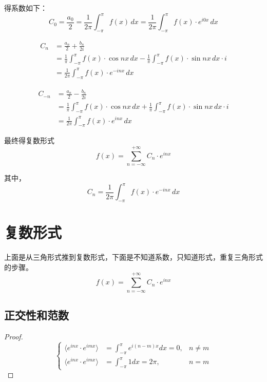 \documentclass[12pt,a4paper]{article}
\numberwithin{subsection}{section}   %
\numberwithin{subsubsection}{subsection}
\theoremstyle{plain}
\theoremstyle{definition}
\theoremstyle{remark}
\theoremstyle{remark}
\begin{document}
 得系数如下：
 \begin{equation}
 	C_0 = \frac{a_0}{2} = \frac{1}{2\pi} \int_{-\pi}^{\pi} f(x) \, dx = \frac{1}{2\pi} \int_{-\pi}^{\pi} f(x) \cdot e^{i0x} \, dx
 \end{equation}
 
\begin{equation}
		\begin{aligned}
		C_n &= \frac{a_n}{2} + \frac{b_n}{2i} \\
		&= \frac{1}{\pi} \int_{-\pi}^{\pi} f(x) \cdot \cos nx \, dx - \frac{1}{\pi} \int_{-\pi}^{\pi} f(x) \cdot \sin nx \, dx \cdot i \\[8pt]
		&= \frac{1}{2\pi} \int_{-\pi}^{\pi} f(x) \cdot e^{-inx} \, dx
	\end{aligned}
\end{equation}

\begin{equation}
		\begin{aligned}
		C_{-n} &= \frac{a_n}{2} - \frac{b_n}{2i} \\
		&= \frac{1}{\pi} \int_{-\pi}^{\pi} f(x) \cdot \cos nx \, dx + \frac{1}{\pi} \int_{-\pi}^{\pi} f(x) \cdot \sin nx \, dx \cdot i \\[8pt]
		&= \frac{1}{2\pi} \int_{-\pi}^{\pi} f(x) \cdot e^{inx} \, dx
	\end{aligned}
\end{equation}

最终得复数形式
	\begin{equation}
		f(x) = \sum_{n=-\infty}^{+\infty} C_n \cdot e^{inx}
	\end{equation}

其中，
\begin{equation}
		C_n =  \frac{1}{2\pi} \int_{-\pi}^{\pi} f(x) \cdot e^{-inx} \, dx
\end{equation}



\section{复数形式}
上面是从三角形式推到复数形式，下面是不知道系数，只知道形式，重复三角形式的步骤。
	\begin{equation}
	f(x) = \sum_{n=-\infty}^{+\infty} C_n \cdot e^{inx}
\end{equation}


\subsection{正交性和范数}
\begin{proof}
\begin{equation}
	\left\{
	\begin{aligned}
		\langle e^{inx} \cdot e^{imx} \rangle &= \int_{-\pi}^{\pi} e^{i(n-m)x} dx = 0, & n \neq m \\[8pt]
		\langle e^{inx} \cdot e^{imx} \rangle &= \int_{-\pi}^{\pi} 1 dx = 2\pi, & n = m
	\end{aligned}
	\right.
\end{equation}
\end{proof}
\end{document}
